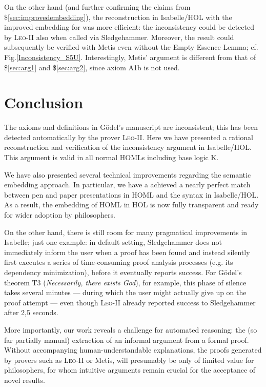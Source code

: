 \documentclass{article}
\begin{document}
On the other hand (and further confirming the claims from \$\ref{sec:improvedembedding}), 
the reconstruction in Isabelle/HOL with the improved embedding for \SFiveU was more efficient: 
the inconsistency could be detected
by \textsc{Leo-II} also when called via
Sledgehammer. Moreover, the result could subsequently be verified with
Metis even without the Empty Essence Lemma; cf. Fig.\ref{Inconsistency_S5U}. 
Interestingly, Metis' argument is different from that of
\$\ref{sec:arg1} and \$\ref{sec:arg2}, since axiom A1b is not used.



\section{Conclusion}\label{sec:conclusion}
The axioms and definitions in G\"odel's manuscript are inconsistent;
this has been detected automatically by the prover
\textsc{Leo-II}. Here we have presented a rational reconstruction and
verification of the inconsistency argument in Isabelle/HOL. This
argument is valid in all normal HOMLs including base logic K.


We have also presented several technical improvements regarding the
semantic embedding approach. In particular, we have a achieved a
nearly perfect match between pen and paper presentations in HOML and
the syntax in Isabelle/HOL. As a result, the embedding of HOML in HOL
is now fully transparent and ready for wider adoption by
philosophers.

On the other hand, there is still room for many pragmatical
improvements in Isabelle; just one example: in default setting,
Sledgehammer does not immediately inform the user when a proof has
been found and instead silently first executes a series of
time-consuming proof analysis processes (e.g. its dependency
minimization), before it eventually reports success. For G\"odel's
theorem T3 (\textit{Necessarily, there exists God}), for example, this
phase of silence takes several minutes --- during which the user might
actually give up on the proof attempt --- even though \textsc{Leo-II} already
reported success to Sledgehammer after 2,5 seconds.

More importantly, our work reveals a challenge for automated reasoning:
the (so far partially manual) extraction of an informal argument from a formal proof. 
Without accompanying human-understandable explanations,
the proofs generated by provers such as \textsc{Leo-II} or Metis, will
presumably be only of limited value for philosophers, for whom intuitive
arguments remain crucial for the acceptance of novel results.
\end{document}
